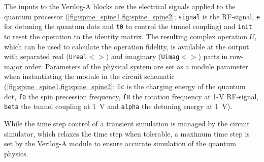 \documentclass[10pt,a4paper,onecolumn,notitlepage]{article}
\begin{document}
The inputs to the Verilog-A blocks are the electrical signals applied to the quantum processor (\cref{fig:spine_spine1,fig:spine_spine2}; \texttt{signal} is the RF-signal, \texttt{e} for detuning the quantum dots and \texttt{t0} to control the tunnel coupling) and \texttt{init} to reset the operation to the identity matrix. The resulting complex operation $U$, which can be used to calculate the operation fidelity, is available at the output with separated real (\texttt{Ureal$<>$}) and imaginary (\texttt{Uimag$<>$}) parts in row-major order. Parameters of the physical system are set as a module parameter when instantiating the module in the circuit schematic (\cref{fig:spine_spine1,fig:spine_spine2}; \texttt{Ec} is the charging energy of the quantum dot, \texttt{f0} the spin precession frequency, \texttt{fR} the rotation frequency at 1-V RF-signal, \texttt{beta} the tunnel coupling at \SI{1}{\volt} and \texttt{alpha} the detuning energy at \SI{1}{\volt}).

While the time step control of a transient simulation is managed by the circuit simulator, which relaxes the time step when tolerable, a maximum time step is set by the Verilog-A module to ensure accurate simulation of the quantum physics.



\end{document}
